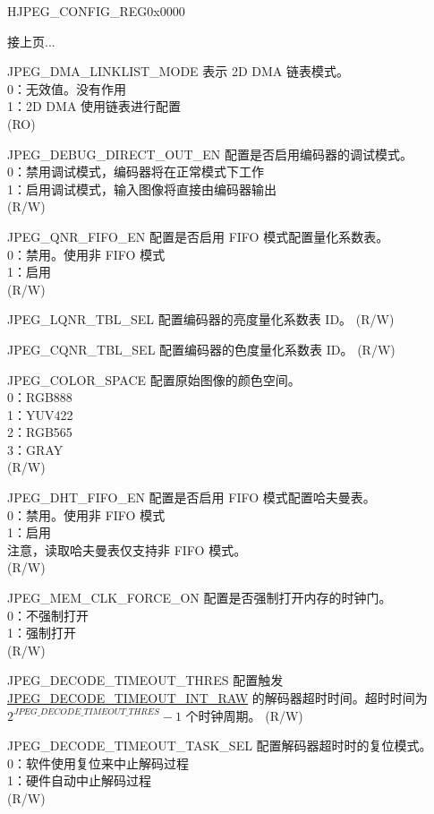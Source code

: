 \addtocounter{Regfloat}{-1}
\begin{register}{H}{JPEG\_CONFIG\_REG}{0x0000}
\begin{regdesc}\begin{reglist}
\item [接上页...]


\label{fielddesc:JPEGDMALINKLISTMODE}\item [JPEG\_DMA\_LINKLIST\_MODE] 表示 2D DMA 链表模式。\\
0：无效值。没有作用\\
1：2D DMA 使用链表进行配置\\ (RO)
\label{fielddesc:JPEGDEBUGDIRECTOUTEN}\item [JPEG\_DEBUG\_DIRECT\_OUT\_EN] 配置是否启用编码器的调试模式。\\
0：禁用调试模式，编码器将在正常模式下工作\\
1：启用调试模式，输入图像将直接由编码器输出\\
(R/W)
\label{fielddesc:JPEGQNRFIFOEN}\item [JPEG\_QNR\_FIFO\_EN] 配置是否启用 FIFO 模式配置量化系数表。\\
0：禁用。使用非 FIFO 模式\\
1：启用\\
(R/W)
\label{fielddesc:JPEGLQNRTBLSEL}\item [JPEG\_LQNR\_TBL\_SEL] 配置编码器的亮度量化系数表 ID。 (R/W)
\label{fielddesc:JPEGCQNRTBLSEL}\item [JPEG\_CQNR\_TBL\_SEL] 配置编码器的色度量化系数表 ID。 (R/W)
\label{fielddesc:JPEGCOLORSPACE}\item [JPEG\_COLOR\_SPACE] 配置原始图像的颜色空间。\\
0：RGB888\\
1：YUV422\\
2：RGB565\\
3：GRAY\\
(R/W)
\label{fielddesc:JPEGDHTFIFOEN}\item [JPEG\_DHT\_FIFO\_EN] 配置是否启用 FIFO 模式配置哈夫曼表。\\
0：禁用。使用非 FIFO 模式\\
1：启用\\
注意，读取哈夫曼表仅支持非 FIFO 模式。\\
(R/W)
\label{fielddesc:JPEGMEMCLKFORCEON}\item [JPEG\_MEM\_CLK\_FORCE\_ON] 配置是否强制打开内存的时钟门。\\
0：不强制打开\\
1：强制打开\\
(R/W)
\label{fielddesc:JPEGDECODETIMEOUTTHRES}\item [JPEG\_DECODE\_TIMEOUT\_THRES] 配置触发 \hyperref[fielddesc:JPEGDECODETIMEOUTINTRAW]{JPEG\_DECODE\_TIMEOUT\_INT\_RAW} 的解码器超时时间。超时时间为 $ 2 ^ {JPEG\_DECODE\_TIMEOUT\_THRES} - 1 $ 个时钟周期。 (R/W)
\label{fielddesc:JPEGDECODETIMEOUTTASKSEL}\item [JPEG\_DECODE\_TIMEOUT\_TASK\_SEL] 配置解码器超时时的复位模式。\\
0：软件使用复位来中止解码过程\\
1：硬件自动中止解码过程\\
(R/W)



\end{reglist}
\end{regdesc}
\end{register}
